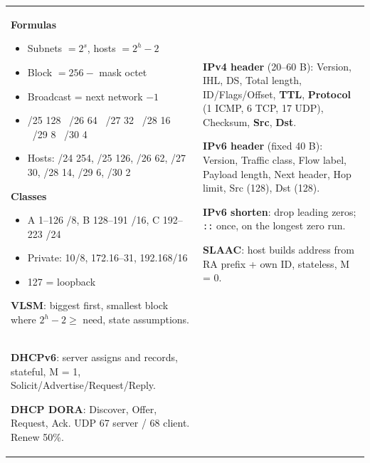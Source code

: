 \documentclass[10pt]{article}
\begin{document}
\newpage
\begin{cheatsheet}
\small
\begin{tabularx}{\linewidth}{@{}XX@{}}
\textbf{Formulas}
\begin{itemize}
\item Subnets $= 2^{s}$, hosts $= 2^{h}-2$
\item Block $= 256 -$ mask octet
\item Broadcast = next network $-1$
\item /25 128 \ /26 64 \ /27 32 \ /28 16 \ /29 8 \ /30 4
\item Hosts: /24 254, /25 126, /26 62, /27 30, /28 14, /29 6, /30 2
\end{itemize}
\textbf{Classes}
\begin{itemize}
\item A 1--126 /8, B 128--191 /16, C 192--223 /24
\item Private: 10/8, 172.16--31, 192.168/16
\item 127 = loopback
\end{itemize}
\textbf{VLSM}: biggest first, smallest block where $2^h - 2 \ge$ need, state assumptions.
&
\textbf{IPv4 header} (20--60 B): Version, IHL, DS, Total length, ID/Flags/Offset, \textbf{TTL}, \textbf{Protocol} (1 ICMP, 6 TCP, 17 UDP), Checksum, \textbf{Src}, \textbf{Dst}.

\textbf{IPv6 header} (fixed 40 B): Version, Traffic class, Flow label, Payload length, Next header, Hop limit, Src (128), Dst (128).

\textbf{IPv6 shorten}: drop leading zeros; \texttt{::} once, on the longest zero run.

\textbf{SLAAC}: host builds address from RA prefix + own ID, stateless, M = 0.\\
\textbf{DHCPv6}: server assigns and records, stateful, M = 1, Solicit/Advertise/Request/Reply.

\textbf{DHCP DORA}: Discover, Offer, Request, Ack. UDP 67 server / 68 client. Renew 50\%.
\end{tabularx}
\end{cheatsheet}
\end{document}
